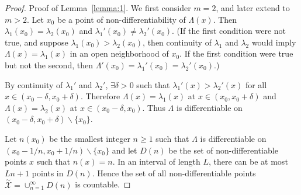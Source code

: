 \documentclass[paper=letter]{scrartcl}
\newcommand{\argmax}{\operatornamewithlimits{argmax}}
\begin{document}
\begin{proof}{Proof of Lemma~\ref{lemma:1}.} We first consider $m=2$, and later extend to $m>2$. Let $x_0$ be a point of non-differentiability of $\Lambda(x)$. 
Then 
$\lambda_1(x_0) = \lambda_2(x_0)$ and 
$\lambda_1'(x_0) \neq \lambda_2'(x_0)$.
(If the first condition were not true, and suppose $\lambda_1(x_0) > \lambda_2(x_0)$, then continuity of $\lambda_1$ and $\lambda_2$ would imply $\Lambda(x) = \lambda_1(x)$ in an open neighborhood of $x_0$.
If the first condition were true but not the second,
then $\Lambda'(x_0) = \lambda_1'(x_0) = \lambda_2'(x_0)$.)



By continuity of $\lambda_1'$ and $\lambda_2'$, $\exists \delta > 0$ such that $\lambda_1'(x) > \lambda_2'(x)$ for all
$x\in(x_0-\delta, x_0+\delta)$. 
Therefore $\Lambda(x)=\lambda_1(x)$ at $x \in (x_0, x_0+\delta)$
and $\Lambda(x)=\lambda_2(x)$ at $x \in (x_0-\delta, x_0)$.
Thus $\Lambda$ is differentiable on $(x_0-\delta, x_0+\delta) \backslash \{x_0\}$. 

Let $n(x_0)$ be the smallest integer $n\ge1$ such that 
$\Lambda$ is differentiable on $(x_0-1/n, x_0+1/n) \backslash \{x_0\}$ and  let $D(n)$ be the set of non-differentiable points $x$ such that $n(x)=n$. In an interval of length $L$, there can be at most 
$Ln+1$ points in $D(n)$. Hence the set of all non-differentiable points $\overset{\sim}{\mathcal{X}} = \cup_{n=1}^{\infty} D(n)$ is countable.


\end{proof}
\end{document}
